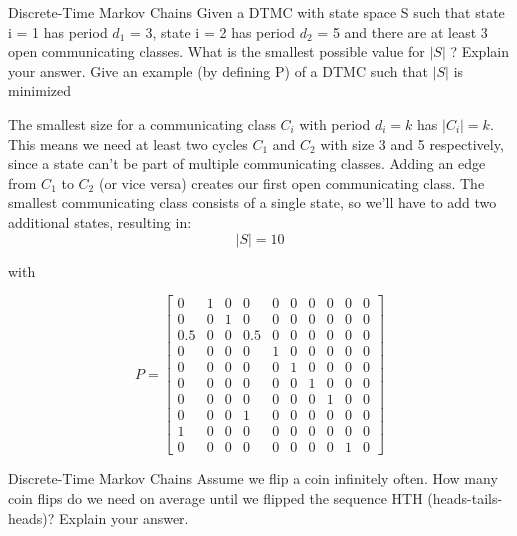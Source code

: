 \begin{problem}{Discrete-Time Markov Chains}
Given a DTMC with state space S such that state i = 1 has period $d_1$ = 3, state i = 2 has period $d_2$ = 5 and there are at least 3 open communicating classes. What is the smallest possible value for $| S |$  ? Explain your answer. Give an example (by defining P) of a DTMC such that $| S |$ is minimized
\end{problem}

\begin{solution}
  The smallest size for a communicating class $C_i$ with period $d_i=k$ has $|C_i|=k$. This means we need at least two cycles $C_1$ and $C_2$ with size 3 and 5 respectively, since a state can't be part of multiple communicating classes. Adding an edge from $C_1$ to $C_2$ (or vice versa) creates our first open communicating class. The smallest communicating class consists of a single state, so we'll have to add two additional states, resulting in:
  \[
  \boxed{| S | = 10}
  \]
\end{solution}

with

\[
P =
\begin{bmatrix}
  0 & 1 & 0 & 0 & 0 & 0 & 0 & 0 & 0 & 0 \\
  0 & 0 & 1 & 0 & 0 & 0 & 0 & 0 & 0 & 0 \\
  0.5 & 0 & 0 & 0.5 & 0 & 0 & 0 & 0 & 0 & 0 \\
  0 & 0 & 0 & 0 & 1 & 0 & 0 & 0 & 0 & 0 \\
  0 & 0 & 0 & 0 & 0 & 1 & 0 & 0 & 0 & 0 \\
  0 & 0 & 0 & 0 & 0 & 0 & 1 & 0 & 0 & 0 \\
  0 & 0 & 0 & 0 & 0 & 0 & 0 & 1 & 0 & 0 \\
  0 & 0 & 0 & 1 & 0 & 0 & 0 & 0 & 0 & 0 \\
  1 & 0 & 0 & 0 & 0 & 0 & 0 & 0 & 0 & 0 \\
  0 & 0 & 0 & 0 & 0 & 0 & 0 & 0 & 1 & 0
\end{bmatrix}
\]

\begin{problem}{Discrete-Time Markov Chains}
Assume we flip a coin infinitely often. How many coin flips do we need on average until we flipped the sequence HTH (heads-tails-heads)? Explain your answer.
\end{problem}

